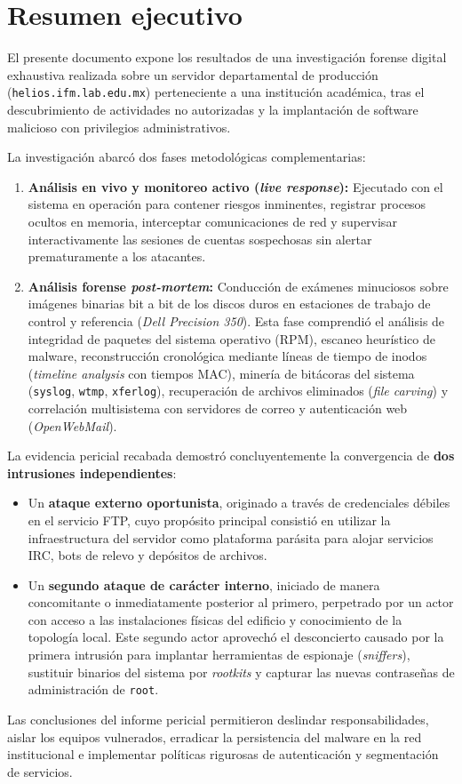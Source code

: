 \chapter*{Resumen ejecutivo}

El presente documento expone los resultados de una investigación forense digital exhaustiva realizada sobre un servidor departamental de producción (\nolinkurl{helios.ifm.lab.edu.mx}) perteneciente a una institución académica, tras el descubrimiento de actividades no autorizadas y la implantación de software malicioso con privilegios administrativos.

La investigación abarcó dos fases metodológicas complementarias:
\begin{enumerate}
    \item \textbf{Análisis en vivo y monitoreo activo (\textit{live response}):} Ejecutado con el sistema en operación para contener riesgos inminentes, registrar procesos ocultos en memoria, interceptar comunicaciones de red y supervisar interactivamente las sesiones de cuentas sospechosas sin alertar prematuramente a los atacantes.
    \item \textbf{Análisis forense \textit{post-mortem}:} Conducción de exámenes minuciosos sobre imágenes binarias bit a bit de los discos duros en estaciones de trabajo de control y referencia (\textit{Dell Precision 350}). Esta fase comprendió el análisis de integridad de paquetes del sistema operativo (RPM), escaneo heurístico de malware, reconstrucción cronológica mediante líneas de tiempo de inodos (\textit{timeline analysis} con tiempos MAC), minería de bitácoras del sistema (\texttt{syslog}, \texttt{wtmp}, \texttt{xferlog}), recuperación de archivos eliminados (\textit{file carving}) y correlación multisistema con servidores de correo y autenticación web (\textit{OpenWebMail}).
\end{enumerate}

\begin{notaforense}
La evidencia pericial recabada demostró concluyentemente la convergencia de \textbf{dos intrusiones independientes}:
\begin{itemize}
    \item Un \textbf{ataque externo oportunista}, originado a través de credenciales débiles en el servicio FTP, cuyo propósito principal consistió en utilizar la infraestructura del servidor como plataforma parásita para alojar servicios IRC, bots de relevo y depósitos de archivos.
    \item Un \textbf{segundo ataque de carácter interno}, iniciado de manera concomitante o inmediatamente posterior al primero, perpetrado por un actor con acceso a las instalaciones físicas del edificio y conocimiento de la topología local. Este segundo actor aprovechó el desconcierto causado por la primera intrusión para implantar herramientas de espionaje (\textit{sniffers}), sustituir binarios del sistema por \textit{rootkits} y capturar las nuevas contraseñas de administración de \texttt{root}.
\end{itemize}
\end{notaforense}

Las conclusiones del informe pericial permitieron deslindar responsabilidades, aislar los equipos vulnerados, erradicar la persistencia del malware en la red institucional e implementar políticas rigurosas de autenticación y segmentación de servicios.
